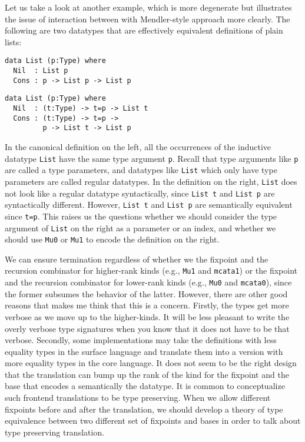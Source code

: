 \documentclass[letterpaper,12pt]{article}
\newcommand{\eg}[0]{e.g., }
\begin{document}
Let us take a look at another example, which is more degenerate
but illustrates the issue of interaction between with Mendler-style
approach more clearly.  The following are two datatypes that are
effectively equivalent definitions of plain lists:
\begin{center}
\begin{minipage}{.49\linewidth}
\begin{verbatim}
data List (p:Type) where
  Nil  : List p
  Cons : p -> List p -> List p
\end{verbatim}
\end{minipage}
\begin{minipage}{.49\linewidth}
\begin{verbatim}
data List (p:Type) where
  Nil  : (t:Type) -> t=p -> List t
  Cons : (t:Type) -> t=p ->
         p -> List t -> List p
\end{verbatim}
\end{minipage}
\end{center}
In the canonical definition on the left, all the occurrences of
the inductive datatype \verb|List| have the same type argument \verb|p|.
Recall that type arguments like \verb|p| are called a type parameters,
and datatypes like \verb|List| which only have type parameters are called
regular datatypes.
In the definition on the right, \verb|List| does not look like
a regular datatype syntactically, since \verb|List t| and \verb|List p|
are syntactically different.  However, \verb|List t| and \verb|List p|
are semantically equivalent since \verb|t=p|.
This raises us the questions whether we should consider
the type argument of \verb|List| on the right as a parameter or an index,
and whether we should use \verb|Mu0| or \verb|Mu1| to encode the definition
on the right.

We can ensure termination regardless of whether we the fixpoint and the
recursion combinator for higher-rank kinds (\eg \verb|Mu1| and \verb|mcata1|)
or the fixpoint and the recursion combinator for lower-rank kinds
(\eg \verb|Mu0| and \verb|mcata0|), since the former subsumes
the behavior of the latter. However, there are other good reasons that
makes me think that this is a concern.
Firstly, the types get more verbose as we move up to the higher-kinds.
It will be less pleasant to write the overly verbose type signatures
when you know that it does not have to be that verbose.
Secondly, some implementations may take the definitions with less
equality types in the surface language and translate them into
a version with more equality types in the core language. It does not
seem to be the right design that the translation can bump up the rank
of the kind for the fixpoint and the base that encodes a semantically
the datatype. It is common to conceptualize such frontend translations
to be type preserving.  When we allow different fixpoints before and
after the translation, we should develop a theory of type equivalence
between two different set of fixpoints and bases in order to talk about
type preserving translation.
\end{document}
